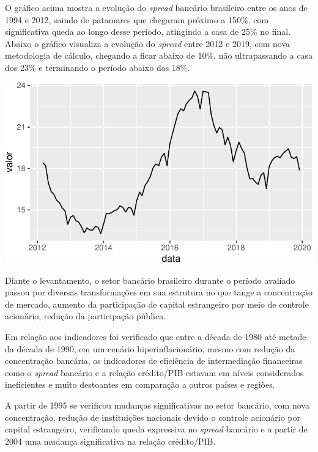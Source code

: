 \documentclass[12pt,openright,oneside,a4paper,chapter=TITLE,section=TITLE,subsection=Title,english,french,spanish,portugues,sumario=tradicional]{04-class-files/abntex2}
\begin{document}
O gráfico acima mostra a evolução do \emph{spread} bancário brasileiro entre os anos de 1994 e 2012, saindo de patamares que chegaram próximo a 150\%, com significativa queda ao longo desse período, atingindo a casa de 25\% no final. Abaixo o gráfico visualiza a evolução do \emph{spread} entre 2012 e 2019, com nova metodologia de cálculo, chegando a ficar abaixo de 10\%, não ultrapassando a casa dos 23\% e terminando o período abaixo dos 18\%.


\begin{center}\includegraphics{12-exportedfigures/spread 2019-1} \end{center}

\label{fig:spread2019}

Diante o levantamento, o setor bancário brasileiro durante o período avaliado passou por diversas transformações em sua estrutura no que tange a concentração de mercado, aumento da participação de capital estrangeiro por meio de controle acionário, redução da participação pública.

Em relação aos indicadores foi verificado que entre a década de 1980 até metade da década de 1990, em um cenário hiperinflacionário, mesmo com redução da concentração bancária, os indicadores de eficiência de intermediação financeiras como o \emph{spread} bancário e a relação crédito/PIB estavam em níveis considerados ineficientes e muito destoantes em comparação a outros países e regiões.

A partir de 1995 se verificou mudanças significativas no setor bancário, com nova concentração, redução de instituições nacionais devido o controle acionário por capital estrangeiro, verificando queda expressiva no \emph{spread} bancário e a partir de 2004 uma mudança significativa na relação crédito/PIB.
\end{document}
